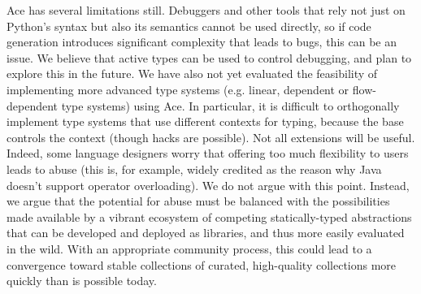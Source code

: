 \documentclass[10pt,preprint]{sigplanconf}
\begin{document}
{%
% 
%
%
%
Ace has several limitations still. Debuggers and other tools that rely not just on Python's syntax but also its semantics cannot be used directly, so if code generation introduces significant complexity that leads to bugs, this can be an issue. We believe that active types can be used to control debugging, and plan to explore this in the future. We have also not yet evaluated the feasibility of implementing more advanced type systems (e.g. linear, dependent or flow-dependent type systems) using Ace. In particular, it is difficult to orthogonally implement type systems that use different contexts for typing, because the base controls the context (though hacks are possible).
%
Not all extensions will be useful. Indeed, some language designers worry that offering too much flexibility to users leads to abuse (this is, for example, widely credited as the reason why Java doesn't support operator overloading). We do not argue with this point. Instead, we argue that the potential for abuse must be balanced with the possibilities made available by a vibrant ecosystem of competing statically-typed abstractions that can be developed and deployed as libraries, and thus more easily evaluated in the wild. With an appropriate community process, this could lead to a convergence toward stable collections of curated, high-quality collections more quickly than is possible today. %
% 

}
\end{document}
